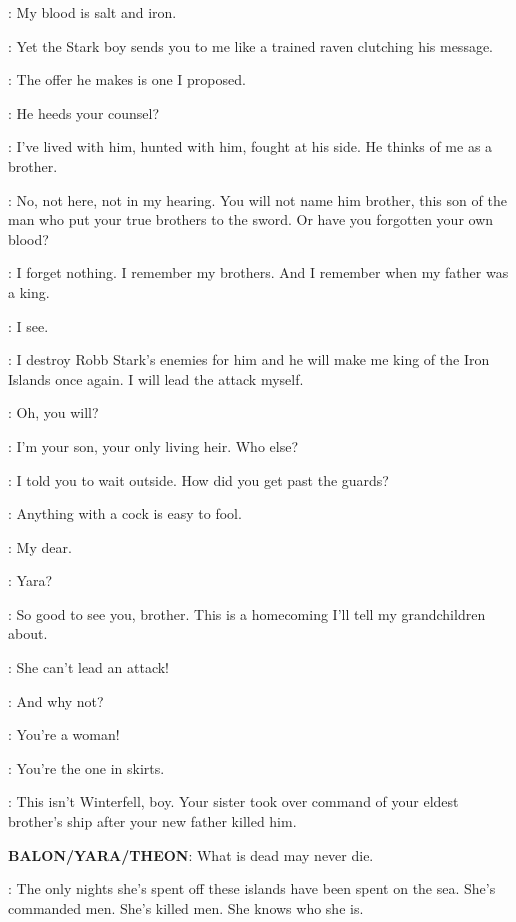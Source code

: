 \THEON: My blood is salt and iron.

\BALON: Yet the Stark boy sends you to me like a trained raven clutching his message.

\THEON: The offer he makes is one I proposed.

\BALON: He heeds your counsel?

\THEON: I've lived with him, hunted with him, fought at his side. He thinks of me as a brother.

\BALON: No, not here, not in my hearing. You will not name him brother, this son of the man who put your true brothers to the sword. Or have you forgotten your own blood?

\THEON: I forget nothing. I remember my brothers. And I remember when my father was a king.

\BALON: I see.

\THEON: I destroy Robb Stark's enemies for him and he will make me king of the Iron Islands once again. I will lead the attack myself.

\BALON: Oh, you will?

\THEON: I'm your son, your only living heir. Who else?


\THEON: I told you to wait outside. How did you get past the guards?

\YARA: Anything with a cock is easy to fool.

\BALON: My dear.

\THEON: Yara?

\YARA: So good to see you, brother. This is a homecoming I'll tell my grandchildren about.

\THEON: She can't lead an attack!

\BALON: And why not?

\THEON: You're a woman!

\YARA: You're the one in skirts.

\BALON: This isn't Winterfell, boy. Your sister took over command of your eldest brother's ship after your new father killed him.

\textbf{BALON/YARA/THEON}:  What is dead may never die.

\BALON: The only nights she's spent off these islands have been spent on the sea. She's commanded men. She's killed men. She knows who she is.


